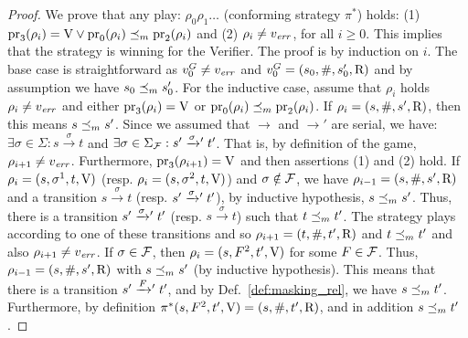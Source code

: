 \begin{proof}
	We prove that any play: $\rho_0 \rho_1 \dots$ (conforming strategy $\pi^*$) holds: 
	(1) $\operatorname{pr}_{3}(\rho_i)=\mathrm{V} \vee \operatorname{pr}_{0}(\rho_i) \preceq_{m} \operatorname{pr}_{2}(\rho_i)$ and 
	(2) $\rho_i \neq v_{\mathit{err}}$, for all $i\geq 0$. This implies that the strategy is winning for the Verifier. 
The proof is by induction on $i$. The base case is straightforward as 
$v_0^G \neq v_{\mathit{err}}$ and $v_0^G = (s_0, \#, s'_0, \mathrm{R})$ and by assumption we have $s_0 \preceq_{m} s'_0$. For the inductive case, assume that 
$\rho_i$ holds $\rho_i \neq v_{\mathit{err}}$ and either $\operatorname{pr}_{3}(\rho_i) = \mathrm{V}$ or $\operatorname{pr}_{0}(\rho_i) \preceq_{m} \operatorname{pr}_{2}(\rho_i)$. 
If $\rho_i = (s, \#, s', \mathrm{R})$, then this means $s \preceq_{m} s'$. Since we assumed that
$\rightarrow$ and $\rightarrow'$ are serial, we have: $\exists \sigma \in \Sigma: s \xrightarrow{\sigma} t$ and $\exists \sigma \in \Sigma_{\mathcal{F}} : s' \mathrel{{\xrightarrow[]{\sigma}}{}'} t'$. That is, by definition of the game, $\rho_{i+1} \neq v_{\mathit{err}}$. 
Furthermore, $\operatorname{pr}_{3}(\rho_{i+1}) = \mathrm{V}$ and then assertions (1) and (2) hold. 
If $\rho_i = (s, \sigma^1, t, \mathrm{V})$ (resp. $\rho_i = (s, \sigma^2, t, \mathrm{V})$) and $\sigma \notin \mathcal{F}$,
we have $\rho_{i-1} = (s, \#, s', \mathrm{R})$ and a transition $s \xrightarrow{\sigma} t$ (resp. $s' \mathrel{{\xrightarrow[]{\sigma}}{}'} t'$), by inductive hypothesis, $s \preceq_{m} s'$. 
Thus, there is a transition $s' \mathrel{{\xrightarrow[]{\sigma}}{}'} t'$ (resp.  $s \xrightarrow{\sigma} t$) such that $t \preceq_{m} t'$. 
The strategy plays according to one of these transitions and so
$\rho_{i+1} = (t, \#, t', \mathrm{R})$ and $t \preceq_{m} t'$ and also $\rho_{i+1} \neq v_{\mathit{err}}$. If $\sigma \in \mathcal{F}$, then $\rho_i = (s, F^2, t', \mathrm{V})$ for some $F \in \mathcal{F}$. 
Thus, $\rho_{i-1} = (s, \#, s', \mathrm{R})$ with $s \preceq_{m} s'$ (by inductive hypothesis). This means that there is a 
transition $s' \mathrel{{\xrightarrow[]{F}}{}'} t'$, and by Def.~\ref{def:masking_rel},
we have $s \preceq_{m} t'$. Furthermore, by definition $\pi^*(s, F^2, t', \mathrm{V}) = (s, \#,t',\mathrm{R})$, 
and in addition $s \preceq_{m} t'$. 


\end{proof}
